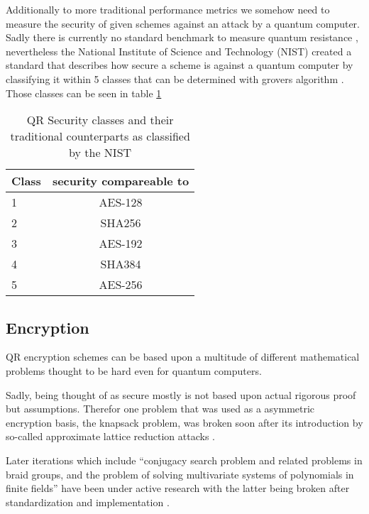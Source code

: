 \documentclass[conference]{IEEEtran}
\newcommand{\comment}[1]{}
\begin{document}
Additionally to more traditional performance metrics we somehow need to measure the security of given schemes against an attack by a quantum computer.
Sadly there is currently no standard benchmark to measure quantum resistance \cite{QR_comparison}, nevertheless the National Institute of Science and Technology (NIST) created a standard that describes how secure a scheme is against a quantum computer by classifying it within 5 classes that can be determined with grovers algorithm \cite{QR_Iot_Lattice,Energy_comp}.
Those classes can be seen in table \ref{QR-classes}

\begin{table}
    \label{QR-classes}
    \centering
    \caption{QR Security classes and their traditional counterparts as classified by the NIST}
    \begin{tabular}{|l | c|}
        \hline
        Class & security compareable to \\
        \hline
        1 & AES-128 \\
        2 & SHA256 \\
        3 & AES-192 \\
        4 & SHA384 \\
        5 & AES-256 \\
        \hline
    \end{tabular} 
\end{table}

\subsection{Encryption}
\comment{ %
} %

QR encryption schemes can be based upon a multitude of different mathematical problems thought to be hard even for quantum computers.

Sadly, being thought of as secure mostly is not based upon actual rigorous proof but assumptions.
Therefor one problem that was used as a asymmetric encryption basis, the knapsack problem, was broken soon after its introduction by so-called approximate lattice reduction attacks \cite{QR_algs}.

Later iterations which include ``conjugacy search problem and related problems in braid groups, and the problem of solving
multivariate systems of polynomials in finite fields''\cite{QR_algs} have been under active research with the latter being broken after standardization and implementation \cite{QR_algs}.
\end{document}

